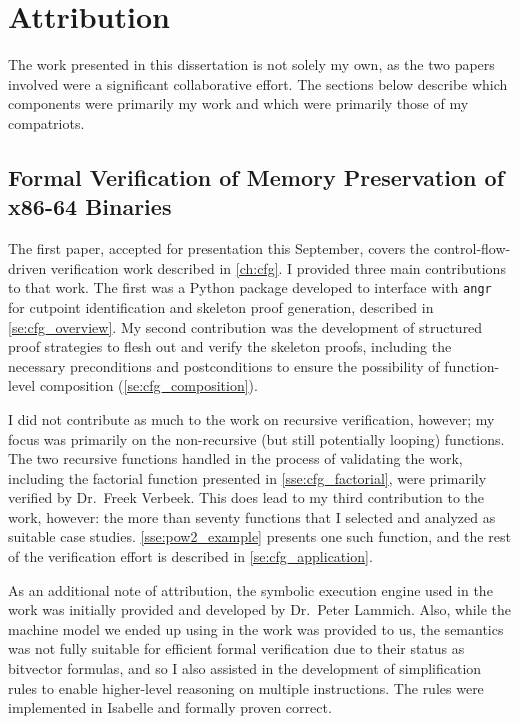 \chapter{Attribution}
The work presented in this dissertation is not solely my own,
as the two papers involved were a significant collaborative effort.
The sections below describe which components were primarily my work
and which were primarily those of my compatriots.

\section*{Formal Verification of Memory Preservation of x86-64 Binaries}
The first paper, accepted for presentation this September,
covers the control-flow-driven verification work described in \cref{ch:cfg}.
I provided three main contributions to that work.
The first was a Python package developed to interface with \texttt{angr}
for cutpoint identification and skeleton proof generation,
described in \cref{se:cfg_overview}.
My second contribution was the development of structured proof strategies
to flesh out and verify the skeleton proofs,
including the necessary preconditions and postconditions to ensure
the possibility of function-level composition (\cref{se:cfg_composition}).

I did not contribute as much to the work on recursive verification, however;
my focus was primarily on the non-recursive (but still potentially looping) functions.
The two recursive functions handled in the process of validating the work,
including the factorial function presented in \cref{sse:cfg_factorial},
were primarily verified by Dr.~Freek Verbeek.
This does lead to my third contribution to the work, however:
the more than seventy functions that I selected and analyzed as suitable case studies.
\cref{sse:pow2_example} presents one such function,
and the rest of the verification effort is described in \cref{se:cfg_application}.

As an additional note of attribution, the symbolic execution engine
used in the work was initially provided and developed by Dr.~Peter Lammich.
Also, while the machine model we ended up using in the work was provided to us,
the semantics was not fully suitable for efficient formal verification
due to their status as bitvector formulas,
and so I also assisted in the development of simplification rules
to enable higher-level reasoning on multiple instructions.
The rules were implemented in Isabelle and formally proven correct.

